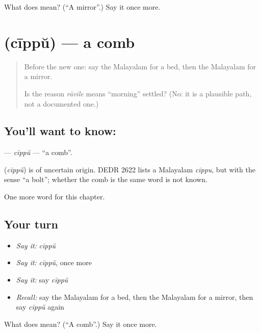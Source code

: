 \begin{tcolorbox}[breakable,colback=teal!4,colframe=teal!35!black,title={Before you move on}]
What does  mean? (\textquotedblleft{}A mirror\textquotedblright{}.) Say it once more.
\end{tcolorbox}
\section[\texorpdfstring{\ml{ചീപ്പ്} (cīppŭ)}{ചീപ്പ് (cīppŭ)}]{ (cīppŭ) — a comb}

\label{lesson:ML-C146-cippu}



\begin{quote}
Before the new one: say the Malayalam for a bed, then the Malayalam for a mirror.

Is the reason \emph{rāvile} means \textquotedblleft{}morning\textquotedblright{} settled? (No: it is a plausible path, not a documented one.)
\end{quote}

\subsection*{You'll want to know: }
\textbf{} — \emph{cīppŭ} — \textquotedblleft{}a comb\textquotedblright{}.

\begin{cousinweb}
\textbf{} (\emph{cīppŭ}) is of uncertain origin. DEDR 2622 lists a Malayalam \emph{cīppu}, but with the sense \textquotedblleft{}a bolt\textquotedblright{}; whether the comb is the same word is not known.
\end{cousinweb}

\begin{grammarlens}[title={What you've built}]
One more word for this chapter.
\end{grammarlens}

\subsection*{Your turn}
\begin{itemize}
\raggedright
  \item \emph{Say it:} \emph{cīppŭ}
  \item \emph{Say it:} \emph{cīppŭ}, once more
  \item \emph{Say it:} say \emph{cīppŭ}
  \item \emph{Recall:} say the Malayalam for a bed, then the Malayalam for a mirror, then say \emph{cīppŭ} again
\end{itemize}

\begin{tcolorbox}[breakable,colback=teal!4,colframe=teal!35!black,title={Before you move on}]
What does  mean? (\textquotedblleft{}A comb\textquotedblright{}.) Say it once more.
\end{tcolorbox}
